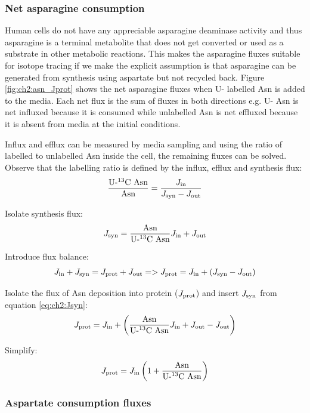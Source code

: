 \subsubsection{Net asparagine consumption}
Human cells do not have any appreciable asparagine deaminase activity \cite{Sullivan2018-gz} and thus asparagine is a terminal metabolite that does not get converted or used as a substrate in other metabolic reactions.
This makes the asparagine fluxes suitable for isotope tracing if we make the explicit assumption is that asparagine can be generated from synthesis using aspartate but not recycled back.
Figure \ref{fig:ch2:asn_Jprot} shows the net asparagine fluxes when U-\hCi{} labelled Asn is added to the media.
Each net flux is the sum of fluxes in both directions e.g. U-\hCi{} Asn is net influxed because it is consumed while unlabelled Asn is net effluxed because it is absent from media at the initial conditions.

Influx and efflux can be measured by media sampling and using the ratio of labelled to unlabelled Asn inside the cell, the remaining fluxes can be solved.
Observe that the labelling ratio is defined by the influx, efflux and synthesis flux:
\begin{equation}
    \frac{\text{U-\textsuperscript{13}C Asn}}{\text{Asn}} = \frac{J_{\text{in}}}{J_{\text{syn}} - J_{\text{out}}}
\end{equation}

Isolate synthesis flux:
\begin{equation}
    J_{\text{syn}} = \frac{\text{Asn}}{\text{U-\textsuperscript{13}C Asn}} J_{\text{in}} + J_{\text{out}}
\label{eq:ch2:Jsyn}
\end{equation}

Introduce flux balance:
\begin{equation}
    J_{\text{in}} + J_{\text{syn}} = J_{\text{prot}} + J_{\text{out}} => J_{\text{prot}} = J_{\text{in}} + (J_{\text{syn}} - J_{\text{out}})
\end{equation}

Isolate the flux of Asn deposition into protein ($J_{\text{prot}}$) and insert $J_{\text{syn}}$ from equation \ref{eq:ch2:Jsyn}:
\begin{equation}
    J_{\text{prot}} = J_{\text{in}} + \left( \frac{\text{Asn}}{\text{U-\textsuperscript{13}C Asn}} J_{\text{in}} + J_{\text{out}} - J_{\text{out}} \right)
\end{equation}

Simplify:
\begin{equation}
    J_{\text{prot}} = J_{\text{in}} \left( 1 + \frac{\text{Asn}}{\text{U-\textsuperscript{13}C Asn}} \right)
\label{eq:ch2:Jprot}
\end{equation}



\subsubsection{Aspartate consumption fluxes}











